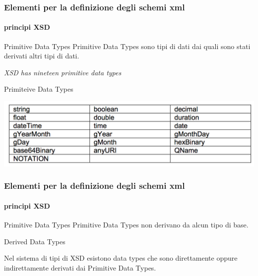 \begin{frame}
	\frametitle{Elementi per la definizione degli schemi xml}
	\framesubtitle{principi XSD}
	\addtocounter{nframe}{1}

	\begin{block}{Primitive Data Types}
		Primitive Data Types sono tipi di dati dai quali sono stati derivati altri tipi di dati.
	\end{block}
	\textit{XSD has nineteen primitive data types}


	\begin{block}{Primiteive Data Types}

		\includegraphics[width=.95\textwidth]{imgs/TabellaDataTypeXSD.png}

	\end{block}

\end{frame}

\begin{frame}
	\frametitle{Elementi per la definizione degli schemi xml}
	\framesubtitle{principi XSD}
	\addtocounter{nframe}{1}

	\begin{block}{Primitive Data Types}
		Primitive Data Types non derivano da alcun tipo di base.
	\end{block}

	\begin{block}{Derived Data Types}

		Nel sistema di tipi di XSD esistono data types che sono direttamente oppure indirettamente derivati dai Primitive Data Types.

	\end{block}

\end{frame}


